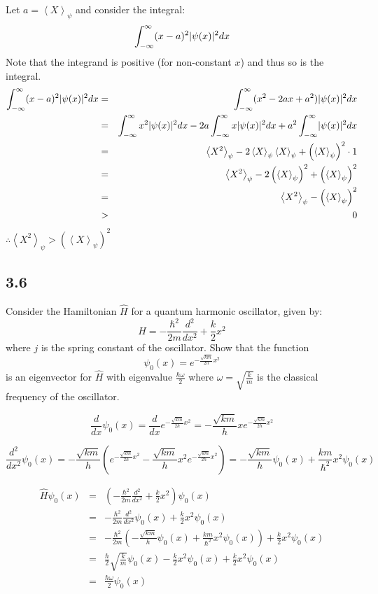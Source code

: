 \documentclass[letterpaper,12pt,fleqn]{article}
\renewcommand{\t}{\psi}
\newcommand{\w}{\omega}
\newcommand{\Hh}{\hat{H}}
\newcommand{\inner}[1]{\left<#1\right>}
\newcommand{\et}[1]{\inner{#1}_{\t}}
\newcommand{\txs}{\abs{\t(x)}^2}
\begin{document}
Let $a=\et{X}$ and consider the integral:
\[\int_{-\infty}^{\infty}(x-a)^2\txs dx\]
Note that the integrand is positive (for non-constant $x$) and thus so is the
integral.
\begin{eqnarray*}
  \int_{-\infty}^{\infty}(x-a)^2\txs dx &=&
  \int_{-\infty}^{\infty}(x^2-2ax+a^2)\txs dx \\
  &=& \int_{-\infty}^{\infty}x^2\txs dx-2a\int_{-\infty}^{\infty}x\txs dx
  +a^2\int_{-\infty}^{\infty}\txs dx \\
  &=& \et{X^2}-2\et{X}\et{X}+\left(\et{X}\right)^2\cdot1 \\
  &=& \et{X^2}-2\left(\et{X}\right)^2+\left(\et{X}\right)^2 \\
  &=& \et{X^2}-\left(\et{X}\right)^2 \\
  &>& 0
\end{eqnarray*}
$\therefore\et{X^2}>\left(\et{X}\right)^2$

\subsection*{3.6}

Consider the Hamiltonian $\Hh$ for a quantum harmonic oscillator, given by:
\[\Hh=-\frac{\hbar^2}{2m}\frac{d^2}{dx^2}+\frac{k}{2}x^2\]
where $j$ is the spring constant of the oscillator. Show that the function
\[\t_0(x)=e^{-\frac{\sqrt{km}}{2h}x^2}\]
is an eigenvector for $\Hh$ with eigenvalue $\frac{\hbar\w}{2}$ where
$\w=\sqrt{\frac{k}{m}}$ is the classical frequency of the oscillator.

\[\frac{d}{dx}\t_0(x)=\frac{d}{dx}e^{-\frac{\sqrt{km}}{2h}x^2}=
-\frac{\sqrt{km}}{h}xe^{-\frac{\sqrt{km}}{2h}x^2}\]

\[\frac{d^2}{dx^2}\t_0(x)=-\frac{\sqrt{km}}{h}\left(
e^{-\frac{\sqrt{km}}{2h}x^2}-\frac{\sqrt{km}}{h}x^2e^{-\frac{\sqrt{km}}{2h}x^2}
\right)=-\frac{\sqrt{km}}{h}\t_0(x)+\frac{km}{\hbar^2}x^2\t_0(x)\]

\begin{eqnarray*}
  \Hh\t_0(x) &=& \left(-\frac{\hbar^2}{2m}\frac{d^2}{dx^2}+\frac{k}{2}x^2
  \right)\t_0(x) \\
  &=& -\frac{\hbar^2}{2m}\frac{d^2}{dx^2}\t_0(x)+\frac{k}{2}x^2\t_0(x) \\
  &=& -\frac{\hbar^2}{2m}
  \left(-\frac{\sqrt{km}}{h}\t_0(x)+\frac{km}{\hbar^2}x^2\t_0(x)\right)+
  \frac{k}{2}x^2\t_0(x) \\
  &=& \frac{\hbar}{2}\sqrt{\frac{k}{m}}\t_0(x)-\frac{k}{2}x^2\t_0(x)+
  \frac{k}{2}x^2\t_0(x) \\
  &=& \frac{\hbar\w}{2}\t_0(x)
\end{eqnarray*}
\end{document}
